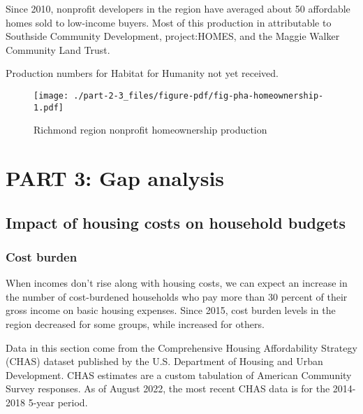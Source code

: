 \documentclass[
  letterpaper,
  DIV=11,
  numbers=noendperiod]{scrreprt}
\begin{document}
Since 2010, nonprofit developers in the region have averaged about 50
affordable homes sold to low-income buyers. Most of this production in
attributable to Southside Community Development, project:HOMES, and the
Maggie Walker Community Land Trust.

\begin{tcolorbox}[enhanced jigsaw, colback=white, colbacktitle=quarto-callout-warning-color!10!white, bottomrule=.15mm, opacitybacktitle=0.6, colframe=quarto-callout-warning-color-frame, breakable, opacityback=0, bottomtitle=1mm, titlerule=0mm, coltitle=black, leftrule=.75mm, left=2mm, title=\textcolor{quarto-callout-warning-color}{\faExclamationTriangle}\hspace{0.5em}{Warning}, toptitle=1mm, arc=.35mm, rightrule=.15mm, toprule=.15mm]
Production numbers for Habitat for Humanity not yet received.
\end{tcolorbox}

\begin{figure}

{\centering \texttt{[image: ./part-2-3\_files/figure-pdf/fig-pha-homeownership-1.pdf]}

}

\caption{\label{fig-pha-homeownership}Richmond region nonprofit
homeownership production}

\end{figure}

\part{PART 3: Gap analysis}

\hypertarget{part-3-2}{%
\chapter{Impact of housing costs on household budgets}\label{part-3-2}}

\hypertarget{cost-burden}{%
\section{Cost burden}\label{cost-burden}}

When incomes don't rise along with housing costs, we can expect an
increase in the number of cost-burdened households who pay more than 30
percent of their gross income on basic housing expenses. Since 2015,
cost burden levels in the region decreased for some groups, while
increased for others.

Data in this section come from the Comprehensive Housing Affordability
Strategy (CHAS) dataset published by the U.S. Department of Housing and
Urban Development. CHAS estimates are a custom tabulation of American
Community Survey responses. As of August 2022, the most recent CHAS data
is for the 2014-2018 5-year period.
\end{document}

